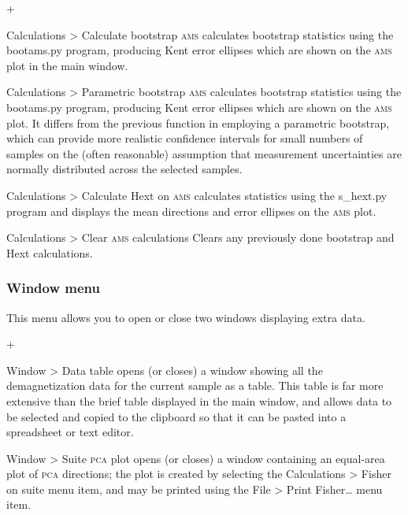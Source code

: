 \documentclass[a4paper]{article}
\newcommand{\menuitemlabel}[1]{%
\mbox{\textsf{#1}}\hfil}
\newenvironment{menuitemlist}%
{\begin{list}{}{%
\renewcommand{\makelabel}{\menuitemlabel}%
\setlength{\labelwidth}{35pt}%
\setlength{\leftmargin}%
             {\labelwidth+\labelsep}}}%
{\end{list}}
\newcommand{\ppcmd}[1]{\textsf{#1}} %
\newcommand{\caps}[1]{\textsc{#1}} %
\newcommand{\submenu}{ \textgreater{} } %
\begin{document}
\begin{menuitemlist}

\item[Calculations\submenu Calculate bootstrap \caps{ams}] calculates
bootstrap statistics using the \ppcmd{bootams.py} program, producing
Kent error ellipses which are shown on the \caps{ams} plot in the main
window.

\item[Calculations\submenu Parametric bootstrap \caps{ams}] calculates
bootstrap statistics using the \ppcmd{bootams.py} program, producing Kent
error ellipses which are shown on the \caps{ams} plot. It differs from the
previous function in employing a parametric bootstrap, which can provide more
realistic confidence intervals for small numbers of samples on the (often
reasonable) assumption that measurement uncertainties are normally
distributed across the selected samples.

\item[Calculations\submenu Calculate Hext on \caps{ams}] calculates
\cite{hext1963tensors} statistics using the \ppcmd{s\_hext.py} program
and displays the mean directions and error ellipses on the \caps{ams} plot.

\item[Calculations\submenu Clear \caps{ams} calculations] Clears
any previously done bootstrap and Hext calculations.

\end{menuitemlist}

\subsubsection{Window menu}

This menu allows you to open or close two windows displaying extra data.

\begin{menuitemlist}

\item[Window\submenu Data table] opens (or closes) a window showing
all the demagnetization data for the current sample as a table. This
table is far more extensive than the brief table displayed in the
main window, and allows data to be selected and copied to the clipboard
so that it can be pasted into a spreadsheet or text editor.

\item[Window\submenu Suite \caps{pca} plot] opens (or closes) a window
containing an equal-area plot of \caps{pca} directions; the plot is created
by selecting the \ppcmd{Calculations\submenu Fisher on suite} menu item,
and may be printed using the \ppcmd{File\submenu Print Fisher\ldots} menu item.

\end{menuitemlist}
\end{document}
